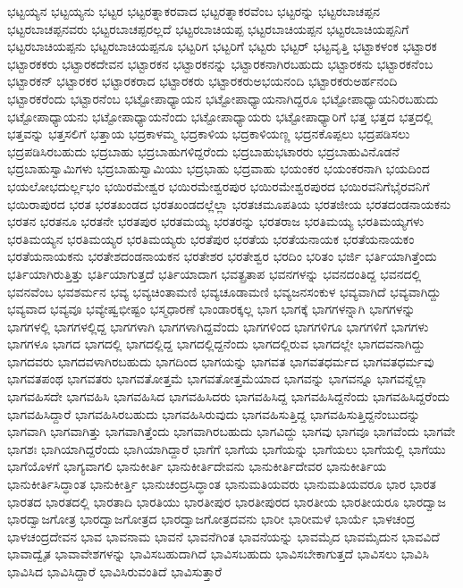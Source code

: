 {ಭಟ್ಟಯ್ಯನ
ಭಟ್ಟಯ್ಯನು
ಭಟ್ಟರ
ಭಟ್ಟರತ್ನಾಕರವಾದ
ಭಟ್ಟರತ್ನಾಕರವೆಂಬ
ಭಟ್ಟರನ್ನು
ಭಟ್ಟರಬಾಚಪ್ಪನ
ಭಟ್ಟರಬಾಚಪ್ಪನವರು
ಭಟ್ಟರಬಾಚಪ್ಪರಲ್ಲದೆ
ಭಟ್ಟರಬಾಚಿಯಪ್ಪ
ಭಟ್ಟರಬಾಚಿಯಪ್ಪನ
ಭಟ್ಟರಬಾಚಿಯಪ್ಪನಿಗೆ
ಭಟ್ಟರಬಾಚಿಯಪ್ಪನು
ಭಟ್ಟರಬಾಚಿಯಪ್ಪನೂ
ಭಟ್ಟರಿಗ
ಭಟ್ಟರಿಗೆ
ಭಟ್ಟರು
ಭಟ್ಟರ್
ಭಟ್ಟವೃತ್ತಿ
ಭಟ್ಟಾಕಳಂಕ
ಭಟ್ಟಾರಕ
ಭಟ್ಟಾರಕಕರು
ಭಟ್ಟಾರಕದೇವನ
ಭಟ್ಟಾರಕನ
ಭಟ್ಟಾರಕನನ್ನು
ಭಟ್ಟಾರಕನಾಗಿರಬಹುದು
ಭಟ್ಟಾರಕನು
ಭಟ್ಟಾರಕನೆಂಬ
ಭಟ್ಟಾರಕನ್
ಭಟ್ಟಾರಕರ
ಭಟ್ಟಾರಕರಾದ
ಭಟ್ಟಾರಕರು
ಭಟ್ಟಾರಕರುಅಭಯನಂದಿ
ಭಟ್ಟಾರಕರುಅರ್ಹನಂದಿ
ಭಟ್ಟಾರಕರೆಂದು
ಭಟ್ಟಾರನೆಂಬ
ಭಟ್ಟೋಪಾಧ್ಯಾಯನ
ಭಟ್ಟೋಪಾಧ್ಯಾಯನಾಗಿದ್ದರೂ
ಭಟ್ಟೋಪಾಧ್ಯಾಯನಿರಬಹುದು
ಭಟ್ಟೋಪಾಧ್ಯಾಯನು
ಭಟ್ಟೋಪಾಧ್ಯಾಯನೆಂದು
ಭಟ್ಟೋಪಾಧ್ಯಾಯರು
ಭಟ್ಟೋಪಾಧ್ಯಾರಿಗೆ
ಭತ್ತ
ಭತ್ತದ
ಭತ್ತದಲ್ಲಿ
ಭತ್ತವನ್ನು
ಭತ್ತಸಲಿಗೆ
ಭತ್ತಾಯ
ಭದ್ರಕಾಳಮ್ಮ
ಭದ್ರಕಾಳಿಯ
ಭದ್ರಕಾಳಿಯಣ್ಣ
ಭದ್ರನಕೊಪ್ಪಲು
ಭದ್ರಪಡಿಸಲು
ಭದ್ರಪಡಿಸಿರಬಹುದು
ಭದ್ರಬಾಹು
ಭದ್ರಬಾಹುಗಳಿದ್ದರೆಂದು
ಭದ್ರಬಾಹುಭಟಾರರು
ಭದ್ರಬಾಹುವಿನೊಡನೆ
ಭದ್ರಬಾಹುಸ್ವಾಮಿಗಳು
ಭದ್ರಬಾಹುಸ್ವಾಮಿಯು
ಭದ್ರಭಾಹು
ಭದ್ರವಾಹು
ಭಯಂಕರ
ಭಯಂಕರನಾಗಿ
ಭಯದಿಂದ
ಭಯಲೋಭದುರ್ಲ್ಲಭಂ
ಭಯಿರಮೇಶ್ವರ
ಭಯಿರಮೇಶ್ವರಪುರ
ಭಯಿರಮೇಶ್ವರಪುರದ
ಭಯಿರವನಿಗೆಭೈರವನಿಗೆ
ಭಯಿರಾಪುರದ
ಭರತ
ಭರತಖಂಡದ
ಭರತಖಂಡದಲ್ಲೆಲ್ಲಾ
ಭರತಚಮೂಪತಿಯ
ಭರತಜೀಯ
ಭರತದಂಡನಾಯಕನು
ಭರತನ
ಭರತನೂ
ಭರತನೇ
ಭರತಪುರ
ಭರತಮಯ್ಯ
ಭರತರನ್ನು
ಭರತರಾಜ
ಭರತಿಮಯ್ಯ
ಭರತಿಮಯ್ಯಗಳು
ಭರತಿಮಯ್ಯನ
ಭರತಿಮಯ್ಯರ
ಭರತಿಮಯ್ಯರು
ಭರತೆಪುರ
ಭರತೆಯ
ಭರತೆಯನಾಯಕ
ಭರತೆಯನಾಯಕಂ
ಭರತೆಯನಾಯಕನು
ಭರತೇಶದಂಡನಾಯಕನ
ಭರತೇಶರ
ಭರತೇಶ್ವರ
ಭರದಿಂ
ಭರಿತಂ
ಭರ್ಜಿ
ಭರ್ತಿಯಾಗಿತ್ತೆಂದು
ಭರ್ತಿಯಾಗಿರುತ್ತಿತ್ತು
ಭರ್ತಿಯಾಗುತ್ತದೆ
ಭರ್ತಿಯಾದಾಗ
ಭವತ್ಪ್ರತಾಪ
ಭವನಗಳನ್ನು
ಭವನದಂತಿದ್ದ
ಭವನದಲ್ಲಿ
ಭವನವೆಂಬ
ಭವಶರ್ಮನ
ಭವ್ಯ
ಭವ್ಯಚಿಂತಾಮಣಿ
ಭವ್ಯಚೂಡಾಮಣಿ
ಭವ್ಯಜನಸಂಕುಳ
ಭವ್ಯವಾಗಿದೆ
ಭವ್ಯವಾಗಿದ್ದು
ಭವ್ಯವಾದ
ಭವ್ಯವೂ
ಭವ್ಯೇಷ್ವಭೀಷ್ಟಂ
ಭಸ್ಮಧಾರಣೆ
ಭಾಂಡಾರಕ್ಕಲ್ಲ
ಭಾಗ
ಭಾಗಕ್ಕೆ
ಭಾಗಗಳನ್ನಾಗಿ
ಭಾಗಗಳನ್ನು
ಭಾಗಗಳಲ್ಲಿ
ಭಾಗಗಳಲ್ಲಿದ್ದ
ಭಾಗಗಳಾಗಿ
ಭಾಗಗಳಾಗಿದ್ದವೆಂದು
ಭಾಗಗಳಿಂದ
ಭಾಗಗಳಿಗೂ
ಭಾಗಗಳಿಗೆ
ಭಾಗಗಳು
ಭಾಗಗಳೂ
ಭಾಗದ
ಭಾಗದಲ್ಲಿ
ಭಾಗದಲ್ಲಿದ್ದ
ಭಾಗದಲ್ಲಿದ್ದನೆಂದು
ಭಾಗದಲ್ಲಿರುವ
ಭಾಗದಲ್ಲೇ
ಭಾಗದವನಾಗಿದ್ದು
ಭಾಗದವರು
ಭಾಗದವಳಾಗಿರಬಹುದು
ಭಾಗದಿಂದ
ಭಾಗಯನ್ನು
ಭಾಗವತ
ಭಾಗವತಧರ್ಮದ
ಭಾಗವತಧರ್ಮವು
ಭಾಗವತಪಂಥ
ಭಾಗವತರು
ಭಾಗವತೋತ್ತಮೆ
ಭಾಗವತೋತ್ತಮೆಯಾದ
ಭಾಗವನ್ನು
ಭಾಗವನ್ನೂ
ಭಾಗವನ್ನೆಲ್ಲಾ
ಭಾಗವಹಿಸದೇ
ಭಾಗವಹಿಸಿ
ಭಾಗವಹಿಸಿದ
ಭಾಗವಹಿಸಿದರು
ಭಾಗವಹಿಸಿದ್ದ
ಭಾಗವಹಿಸಿದ್ದನೆಂದು
ಭಾಗವಹಿಸಿದ್ದರೆಂದು
ಭಾಗವಹಿಸಿದ್ದಾರೆ
ಭಾಗವಹಿಸಿರಬಹುದು
ಭಾಗವಹಿಸಿರುವುದು
ಭಾಗವಹಿಸುತ್ತಿದ್ದ
ಭಾಗವಹಿಸುತ್ತಿದ್ದನೆಂಬುದನ್ನು
ಭಾಗವಾಗಿ
ಭಾಗವಾಗಿತ್ತು
ಭಾಗವಾಗಿತ್ತೆಂದು
ಭಾಗವಾಗಿರಬಹುದು
ಭಾಗವಿದ್ದು
ಭಾಗವು
ಭಾಗವೂ
ಭಾಗವೆಂದು
ಭಾಗವೇ
ಭಾಗಶಃ
ಭಾಗಿಯಾಗಿದ್ದರೆಂದು
ಭಾಗಿಯಾಗಿದ್ದಾರೆ
ಭಾಗೆಗೆ
ಭಾಗೆಯ
ಭಾಗೆಯನ್ನು
ಭಾಗೆಯಲು
ಭಾಗೆಯಲ್ಲಿ
ಭಾಗೆಯು
ಭಾಗೆಯೊಳಗೆ
ಭಾಗ್ಯವಾಗಲಿ
ಭಾನುಕೀರ್ತಿ
ಭಾನುಕೀರ್ತಿದೇವನು
ಭಾನುಕೀರ್ತಿದೇವರ
ಭಾನುಕೀರ್ತಿಯ
ಭಾನುಕೀರ್ತಿಸಿದ್ಧಾಂತ
ಭಾನುಕೀರ್ತ್ತಿ
ಭಾನುಚಂದ್ರಸಿದ್ಧಾಂತ
ಭಾನುಮತಿಯವರು
ಭಾನುಮತಿಯವರೂ
ಭಾರ
ಭಾರತ
ಭಾರತದ
ಭಾರತದಲ್ಲಿ
ಭಾರತಾದಿ
ಭಾರತಿಯು
ಭಾರತೀಪುರ
ಭಾರತೀಪುರದ
ಭಾರತೀಯ
ಭಾರತೀಯರೂ
ಭಾರದ್ವಾಜ
ಭಾರದ್ವಾಜಗೋತ್ರ
ಭಾರದ್ವಾಜಗೋತ್ರದ
ಭಾರದ್ವಾಜಗೋತ್ರದವನು
ಭಾರೀ
ಭಾರೀಮಳೆ
ಭಾರ್ಯೆ
ಭಾಳಚಂದ್ರ
ಭಾಳಚಂದ್ರದೇವನ
ಭಾವ
ಭಾವನಾಮ
ಭಾವನೆ
ಭಾವನೆಗಿಂತ
ಭಾವನೆಯನ್ನು
ಭಾವಮೈದ
ಭಾವಮೈದುನ
ಭಾವವಿದೆ
ಭಾವಾದ್ವೈತ
ಭಾವಾವೇಶಗಳನ್ನು
ಭಾವಿಸಬಹುದಾಗಿದೆ
ಭಾವಿಸಬಹುದು
ಭಾವಿಸಬೇಕಾಗುತ್ತದೆ
ಭಾವಿಸಲು
ಭಾವಿಸಿ
ಭಾವಿಸಿದ
ಭಾವಿಸಿದ್ದಾರೆ
ಭಾವಿಸಿರುವಂತಿದೆ
ಭಾವಿಸುತ್ತಾರೆ
}
